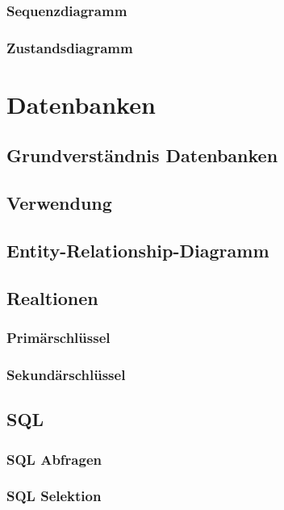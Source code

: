 \documentclass[12pt,a4paper]{article}
\begin{document}
    \subsubsection{Sequenzdiagramm}

    \subsubsection{Zustandsdiagramm}

\section{Datenbanken}

\subsection{Grundverständnis Datenbanken}

\subsection{Verwendung}

\subsection{Entity-Relationship-Diagramm}

\subsection{Realtionen}
    \subsubsection{Primärschlüssel}
    \subsubsection{Sekundärschlüssel}

\subsection{SQL}
    \subsubsection{SQL Abfragen}
    \subsubsection{SQL Selektion}
\end{document}
